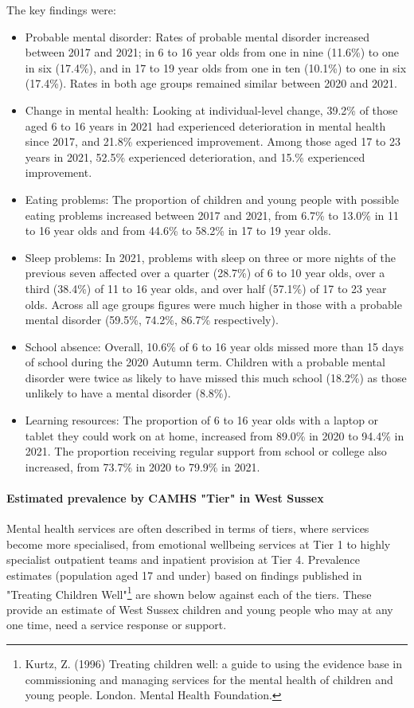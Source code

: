 The key findings were:
\begin{itemize}
    \item Probable mental disorder: Rates of probable mental disorder increased between 2017 and 2021; in 6 to 16 year olds from one in nine (11.6\%) to one in six (17.4\%), and in 17 to 19 year olds from one in ten (10.1\%) to one in six (17.4\%). Rates in both age groups remained similar between 2020 and 2021.
    \item Change in mental health: Looking at individual-level change, 39.2\% of those aged 6 to 16 years in 2021 had experienced deterioration in mental health since 2017, and 21.8\% experienced improvement. Among those aged 17 to 23 years in 2021, 52.5\% experienced deterioration, and 15.\% experienced improvement.
    \item Eating problems: The proportion of children and young people with possible eating problems increased between 2017 and 2021, from 6.7\% to 13.0\% in 11 to 16 year olds and from 44.6\% to 58.2\% in 17 to 19 year olds.
    \item Sleep problems: In 2021, problems with sleep on three or more nights of the previous seven affected over a quarter (28.7\%) of 6 to 10 year olds, over a third (38.4\%) of 11 to 16 year olds, and over half (57.1\%) of 17 to 23 year olds. Across all age groups figures were much higher in those with a probable mental disorder (59.5\%, 74.2\%, 86.7\% respectively).
    \item School absence: Overall, 10.6\% of 6 to 16 year olds missed more than 15 days of school during the 2020 Autumn term. Children with a probable mental disorder were twice as likely to have missed this much school (18.2\%) as those unlikely to have a mental disorder (8.8\%).
    \item Learning resources: The proportion of 6 to 16 year olds with a laptop or tablet they could work on at home, increased from 89.0\% in 2020 to 94.4\% in 2021. The proportion receiving regular support from school or college also increased, from 73.7\% in 2020 to 79.9\% in 2021.
\end{itemize}

\paragraph{Estimated prevalence by CAMHS "Tier" in West Sussex} Mental health services are often described in terms of tiers, where services become more specialised, from emotional wellbeing services at Tier 1 to highly specialist outpatient teams and inpatient provision at Tier 4. Prevalence estimates (population aged 17 and under) based on findings published in "Treating Children Well"\footnote{Kurtz, Z. (1996) Treating children well: a guide to using the evidence base in commissioning and managing services for the mental health of children and young people. London. Mental Health Foundation.} are shown below against each of the tiers. These provide an estimate of West Sussex children and young people who may at any one time, need a service response or support.


